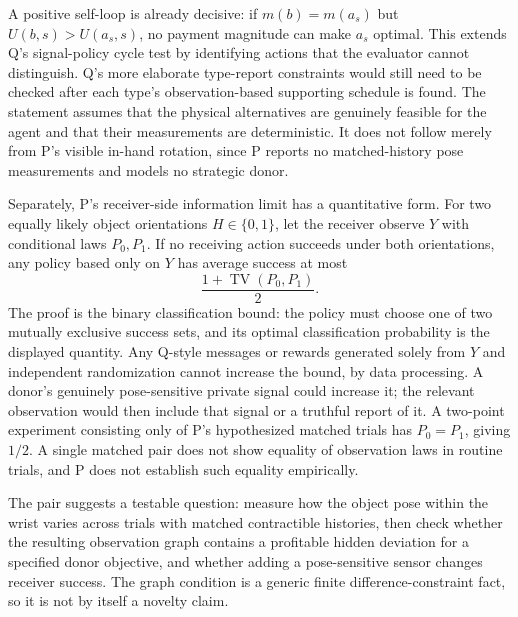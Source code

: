 \documentclass{article}
\begin{document}
A positive self-loop is already decisive: if \(m(b)=m(a_s)\) but
\(U(b,s)>U(a_s,s)\), no payment magnitude can make \(a_s\) optimal.
This extends Q's signal-policy cycle test by identifying actions that the
evaluator cannot distinguish. Q's more elaborate type-report constraints
would still need to be checked after each type's observation-based
supporting schedule is found. The statement assumes that the physical
alternatives are genuinely feasible for the agent and that their
measurements are deterministic. It does not follow merely from P's visible
in-hand rotation, since P reports no matched-history pose measurements and
models no strategic donor.

Separately, P's receiver-side information limit has a quantitative form.
For two equally likely object orientations \(H\in\{0,1\}\), let the receiver
observe \(Y\) with conditional laws \(P_0,P_1\). If no receiving action
succeeds under both orientations, any policy based only on \(Y\) has average
success at most
\[
\frac{1+\operatorname{TV}(P_0,P_1)}{2}.
\]
The proof is the binary classification bound: the policy must choose one of
two mutually exclusive success sets, and its optimal classification
probability is the displayed quantity. Any Q-style messages or rewards
generated solely from \(Y\) and independent randomization cannot increase
the bound, by data processing. A donor's genuinely pose-sensitive private
signal could increase it; the relevant observation would then include that
signal or a truthful report of it. A two-point experiment consisting only of
P's hypothesized matched trials has \(P_0=P_1\), giving \(1/2\). A single
matched pair does not show equality of observation laws in routine trials,
and P does not establish such equality empirically.

The pair suggests a testable question: measure how the object pose within
the wrist varies across trials with matched contractible histories, then
check whether the resulting observation graph contains a profitable hidden
deviation for a specified donor objective, and whether adding a pose-sensitive
sensor changes receiver success. The graph condition is a generic finite
difference-constraint fact, so it is not by itself a novelty claim.
\end{document}
